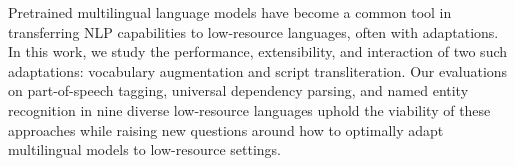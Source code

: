 Pretrained multilingual language models have become a common tool in transferring NLP capabilities to low-resource languages, often with adaptations.  In this work, we study the performance, extensibility, and interaction of two such adaptations: vocabulary augmentation and script transliteration.  Our evaluations on part-of-speech tagging, universal dependency parsing, and named entity recognition in nine diverse low-resource languages uphold the viability of these approaches while raising new questions around how to optimally adapt multilingual models to low-resource settings.
